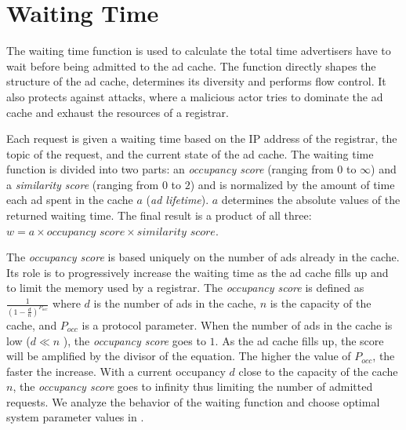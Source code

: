 
\section{Waiting Time}
\label{sec:waitingTime}

The waiting time function is used to calculate the total time advertisers have to wait before being admitted to the ad cache. 
The function directly shapes the structure of the ad cache, determines its diversity and performs flow control. 
It also protects against attacks, where a malicious actor tries to dominate the ad cache and exhaust the resources of a registrar. 

Each request is given a waiting time based on the IP address of the registrar, the topic of the request, and the current state of the ad cache.
The waiting time function is divided into two parts: an \emph{occupancy score} (ranging from $0$ to $\infty$) and a \emph{similarity score} (ranging from $0$ to $2$) and is normalized by the amount of time each ad spent in the cache $a$ (\ie \emph{ad lifetime}). $a$ determines the absolute values of the returned waiting time.  The final result is a product of all three: $w = a \times \textit{occupancy score} \times \textit{similarity score}.$

The \emph{occupancy score} is based uniquely on the number of ads already in the cache.
Its role is to progressively increase the waiting time as the ad cache fills up and to limit the memory used by a registrar.
The \emph{occupancy score} is defined as $\frac{1}{(1-\frac{d}{n})^{P_\textit{occ}}}$
where $d$ is the number of ads in the cache, $n$ is the capacity of the cache, and $P_\textit{occ}$ is a protocol parameter. 
When the number of ads in the cache is low ($d \ll n$ ), the \emph{occupancy score} goes to $1$. 
As the ad cache fills up, the score will be amplified by the divisor of the equation. 
The higher the value of $P_\textit{occ}$, the faster the increase. 
With a current occupancy $d$ close to the capacity of the cache $n$, the \emph{occupancy score} goes to infinity thus limiting the number of admitted requests.
We analyze the behavior of the waiting function and choose optimal system parameter values in .

